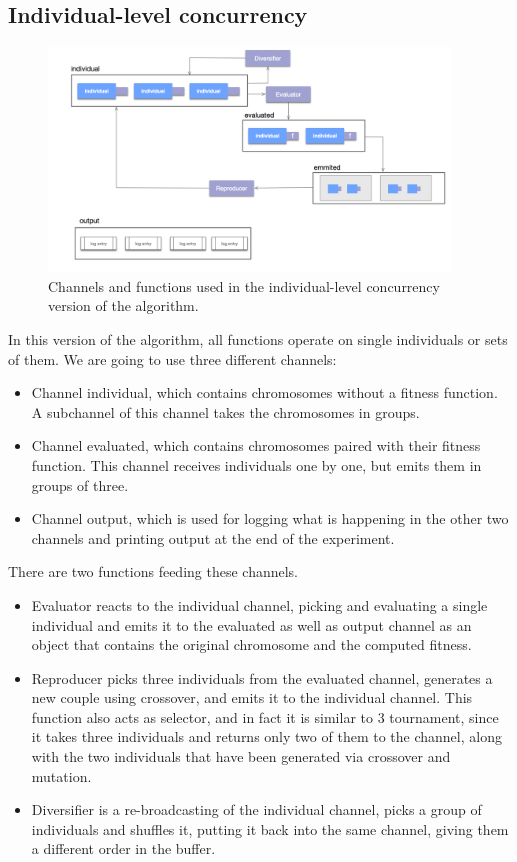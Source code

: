 \documentclass[sigconf]{acmart}
\begin{document}
\subsection{Individual-level concurrency}
\label{ss:indi}
%
\begin{figure}[t!bp]
\includegraphics[width=0.95\textwidth]{channels-individual.png}
\caption{Channels and functions used in the individual-level concurrency version of the algorithm. }
\label{fig:indi}
\end{figure}


In this version of the algorithm, all functions operate on single individuals or sets of them. We are going to use three different channels:\begin{itemize}
\item Channel {\sf individual}, which contains chromosomes without a fitness
  function. A subchannel of this channel takes the chromosomes in groups.
\item Channel {\sf evaluated}, which contains chromosomes paired with
  their fitness function. This channel receives individuals one by
  one, but emits them in groups of three.
\item Channel {\sf output}, which is used for logging what is
  happening in the other two channels and printing output at the end
  of the experiment.
\end{itemize}

There are two functions feeding these channels. \begin{itemize}
  
\item {\sf Evaluator} reacts to the {\sf individual} channel, picking and evaluating a single individual and emits it to the {\sf evaluated} as
  well as {\sf output} channel as an object that contains the original chromosome and the computed fitness. 
\item {\sf Reproducer} picks three individuals from the {\sf
    evaluated} channel, generates a new couple using crossover, and
  emits it to the {\sf individual} channel. This function also acts as
  selector, and in fact it is similar to 3 tournament, since it takes three individuals and returns only two of them to the channel, along with the two individuals that have been generated via crossover and mutation. 
\item {\sf Diversifier} is a re-broadcasting of the {\sf individual
    channel}, picks a group of individuals and shuffles it, putting it
  back into the same channel, giving them a different order in the
  buffer.
\end{itemize}
\end{document}
